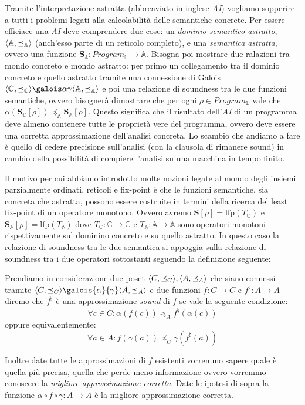 Tramite l'interpretazione astratta (abbreaviato in inglese \textit{AI}) vogliamo sopperire a tutti i problemi legati alla calcolabilità delle semantiche concrete. Per essere efficiace una \textit{AI} deve comprendere due cose: un \textit{dominio semantico astratto}, \(\langle \mathbb{A}, \preceq_{\mathbb{A}}\rangle\) (anch'esso parte di un reticolo completo), e una \textit{semantica astratta}, ovvero una funzione \(\textbf{S}_{\mathbb{A}}:Program_\mathbb{L}\rightarrow \mathbb{A}\). Bisogna poi mostrare due ralazioni tra mondo concreto e mondo astratto: per primo un collegamento tra il dominio concreto e quello astratto tramite una connessione di Galois \(\GaloisConnection{\mathbb{C}}{\mathbb{A}}\) e poi una relazione di soundness tra le due funzioni semantiche, ovvero bisognerà dimostrare che per ogni \(\rho\in Program_{\mathbb{L}}\) vale che \(\alpha(\textbf{S}_{\mathbb{C}}[\rho])\preceq_{\mathbb{A}}\textbf{S}_{\mathbb{A}}[\rho]\). Questo significa che il risultato dell'\textit{AI} di un programma deve almeno contenere tutte le proprietà vere del programma, ovvero deve essere una corretta approssimazione dell'analisi concreta. Lo scambio che andiamo a fare è quello di cedere precisione sull'analisi (con la clausola di rimanere sound) in cambio della possibilità di compiere l'analisi su una macchina in tempo finito. 

Il motivo per cui abbiamo introdotto molte nozioni legate al mondo degli insiemi parzialmente ordinati, reticoli e fix-point è che le funzioni semantiche, sia concreta che astratta, possono essere costruite in termini della ricerca del least fix-point di un operatore monotono. Ovvero avremo \(\mathbf{S}[\rho]=\textrm{lfp}(T_{\mathbb{C}})\) e \(\mathbf{S}_{\mathbb{A}}[\rho]=\textrm{lfp}(T_{\mathbb{A}})\) dove \(T_{\mathbb{C}}:\mathbb{C}\rightarrow \mathbb{C}\) e \(T_{\mathbb{A}}:\mathbb{A}\rightarrow \mathbb{A}\) sono operatori monotoni rispettivamente sul dominino concreto e su quello astratto. In questo caso la relazione di soundness tra le due semantica si appoggia sulla relazione di soundness tra i due operatori sottostanti seguendo la definizione seguente:

\begin{definition}[Soundness]
Prendiamo in considerazione due poset \(\langle C, \preceq_{C}\rangle, \langle A, \preceq_{A}\rangle\) che siano connessi tramite \(\simplePoset{C}\galois{\alpha}{\gamma}\simplePoset{A}\) e due funzioni \(f:C\rightarrow C\) e \(f^{\natural}:A\rightarrow A\) diremo che \(f^{\natural}\) è una approssimazione \textit{sound} di \(f\) se vale la seguente condizione:
\[\forall c\in C : \alpha(f(c))\preceq_A f^{\natural}(\alpha(c))\]
oppure equivalentemente:
\[\forall a\in A : f(\gamma(a)) \preceq_C \gamma(f^{\natural}(a))\]

Inoltre date tutte le approssimazioni di \(f\) esistenti vorremmo sapere quale è quella più precisa, quella che perde meno informazione ovvero vorremmo conoscere la \textit{migliore approssimazione corretta}. Date le ipotesi di sopra la funzione \(\alpha\circ f\circ\gamma:A\rightarrow A\) è la migliore approssimazione corretta.
\end{definition}

